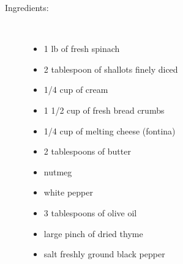 \documentclass[11pt,letterpaper]{article}
\begin{document}


\begin{description}

\item[Ingredients:]\ \\
	\begin{itemize}
	\item 1 lb of fresh spinach
	\item 2 tablespoon of shallots finely diced
	\item 1/4 cup of cream
	\item 1 1/2 cup of fresh bread crumbs
	\item 1/4 cup of melting cheese (fontina)
	\item 2 tablespoons of butter
	\item nutmeg
	\item white pepper
	\item 3 tablespoons of olive oil
	\item large pinch of dried thyme
	\item salt freshly ground black pepper
	\end{itemize}


\end{description}
\end{document}
